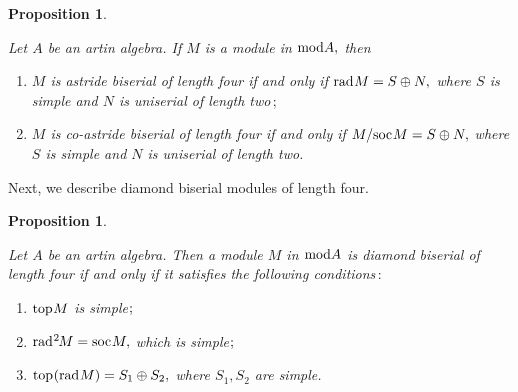 \documentclass[10pt]{amsart}
\newtheorem{Prop}[Theo]{Proposition}
\theoremstyle{definition}
\newcommand{\mmod}{{\rm mod}}
\newcommand{\rad}{{\rm rad}\hspace{.5pt}}
\newcommand{\soc}{{\rm soc}\hspace{.5pt}}
\newcommand{\ntop}{{\rm top}\hspace{.5pt}}
\newcommand{\vp}{\vspace{.5pt}}
\begin{document}
\begin{Prop}\label{loc_mod_l4}

Let $A$ be an artin algebra. If $M$ is a module in $\mmod A,$ then

\begin{enumerate}[$(1)$]

\vspace{-2pt}

\item $M$ is astride biserial of length four if and only if $\rad M=S\oplus N,$ \vp where $S$ is simple and $N$ is uniserial of length two$\,;$

\vp

\item $M$ is co-astride biserial of length four if and only if $M/\soc M=S\oplus N,$ where $S$ is simple and $N$ is uniserial of length two.

\end{enumerate}\end{Prop}


\smallskip

Next, we describe diamond biserial modules of length four. \vspace{-1pt}

\begin{Prop}\label{lozenge_char}

Let $A$ be an artin algebra. Then a module $M$ in $\mmod A$ is diamond biserial of length four if and only if it satisfies
the following conditions$\,:$

\begin{enumerate}[$(1)$]

\vspace{-3pt}
    
\item $\ntop M$ is simple$\hspace{.5pt};$

\item $\rad^2\hspace{-1pt}M=\soc M,$ which is simple$\hspace{.5pt};$

\item $\ntop(\rad M)=S_1\oplus S_2,$ where $S_1, S_2$ are simple. 

\end{enumerate}\end{Prop}
\end{document}

